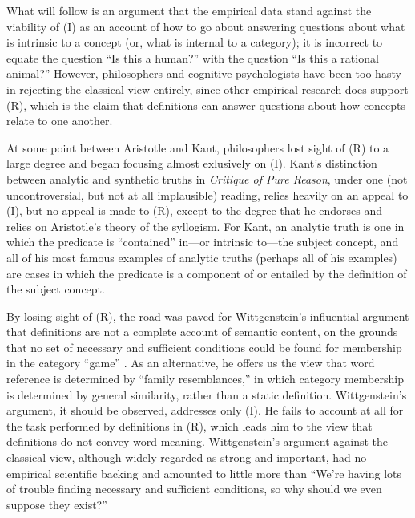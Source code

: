 What will follow is an argument that the empirical data stand against the viability of (I) as an account of how to go about answering questions about what is intrinsic to a concept (or, what is internal to a category); it is incorrect to equate the question ``Is this a human?'' with the question ``Is this a rational animal?'' However, philosophers and cognitive psychologists have been too hasty in rejecting the classical view entirely, since other empirical research does support (R), which is the claim that definitions can answer questions about how concepts relate to one another.

At some point between Aristotle and Kant, philosophers lost sight of (R) to a large degree and began focusing almost exlusively on (I). Kant's distinction between analytic and synthetic truths in \emph{Critique of Pure Reason}, under one (not uncontroversial, but not at all implausible) reading, relies heavily on an appeal to (I), but no appeal is made to (R), except to the degree that he endorses and relies on Aristotle's theory of the syllogism. For Kant, an analytic truth is one in which the predicate is ``contained'' in---or intrinsic to---the subject concept, and all of his most famous examples of analytic truths (perhaps all of his examples) are cases in which the predicate is a component of or entailed by the definition of the subject concept.

By losing sight of (R), the road was paved for Wittgenstein's influential argument that definitions are not a complete account of semantic content, on the grounds that no set of necessary and sufficient conditions could be found for membership in the category ``game'' \cite{wittgenstein_philosophical_1953}. As an alternative, he offers us the view that word reference is determined by ``family resemblances,'' in which category membership is determined by general similarity, rather than a static definition. Wittgenstein's argument, it should be observed, addresses only (I). He fails to account at all for the task performed by definitions in (R), which leads him to the view that definitions do not convey word meaning. Wittgenstein's argument against the classical view, although widely regarded as strong and important, had no empirical scientific backing and amounted to little more than ``We're having lots of trouble finding necessary and sufficient conditions, so why should we even suppose they exist?''


